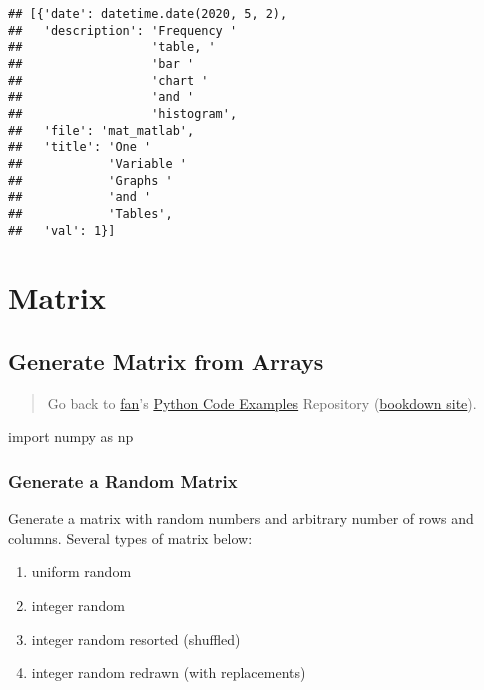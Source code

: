 \documentclass[
]{book}
\newenvironment{Shaded}{\begin{snugshade}}{\end{snugshade}}
\newcommand{\ImportTok}[1]{#1}
\newcommand{\NormalTok}[1]{#1}
\providecommand{\tightlist}{%
  \setlength{\itemsep}{0pt}\setlength{\parskip}{0pt}}
\begin{document}
\begin{verbatim}
## [{'date': datetime.date(2020, 5, 2),
##   'description': 'Frequency '
##                  'table, '
##                  'bar '
##                  'chart '
##                  'and '
##                  'histogram',
##   'file': 'mat_matlab',
##   'title': 'One '
##            'Variable '
##            'Graphs '
##            'and '
##            'Tables',
##   'val': 1}]
\end{verbatim}

\hypertarget{matrix}{%
\section{Matrix}\label{matrix}}

\hypertarget{generate-matrix-from-arrays}{%
\subsection{Generate Matrix from Arrays}\label{generate-matrix-from-arrays}}

\begin{quote}
Go back to \href{http://fanwangecon.github.io/}{fan}'s \href{https://fanwangecon.github.io/pyfan/}{Python Code Examples} Repository (\href{https://fanwangecon.github.io/pyfan/bookdown}{bookdown site}).
\end{quote}

\begin{Shaded}
\begin{Highlighting}[]
\ImportTok{import}\NormalTok{ numpy }\ImportTok{as}\NormalTok{ np}
\end{Highlighting}
\end{Shaded}

\hypertarget{generate-a-random-matrix}{%
\subsubsection{Generate a Random Matrix}\label{generate-a-random-matrix}}

Generate a matrix with random numbers and arbitrary number of rows and columns. Several types of matrix below:

\begin{enumerate}
\def\labelenumi{\arabic{enumi}.}
\tightlist
\item
  uniform random
\item
  integer random
\item
  integer random resorted (shuffled)
\item
  integer random redrawn (with replacements)
\end{enumerate}
\end{document}
